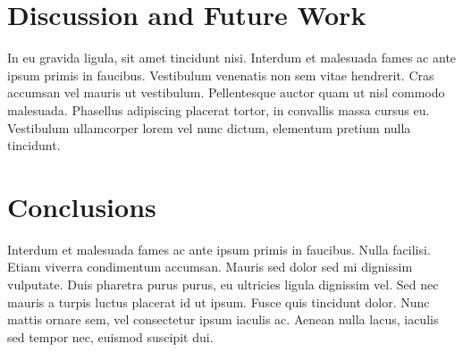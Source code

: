 \documentclass{acm_proc_article-sp}
\begin{document}
\section{Discussion and Future Work}
In eu gravida ligula, sit amet tincidunt nisi. Interdum et malesuada fames ac
ante ipsum primis in faucibus.  Vestibulum venenatis non sem vitae hendrerit.
Cras accumsan vel mauris ut vestibulum. Pellentesque auctor quam ut nisl
commodo malesuada. Phasellus adipiscing placerat tortor, in convallis massa
cursus eu. Vestibulum ullamcorper lorem vel nunc dictum, elementum pretium
nulla tincidunt.

\section{Conclusions}

Interdum et malesuada fames ac ante ipsum primis in faucibus. Nulla facilisi.
Etiam viverra condimentum accumsan. Mauris sed dolor sed mi dignissim
vulputate. Duis pharetra purus purus, eu ultricies ligula dignissim vel. Sed
nec mauris a turpis luctus placerat id ut ipsum. Fusce quis tincidunt dolor.
Nunc mattis ornare sem, vel consectetur ipsum iaculis ac. Aenean nulla lacus,
iaculis sed tempor nec, euismod suscipit dui.




\end{document}
